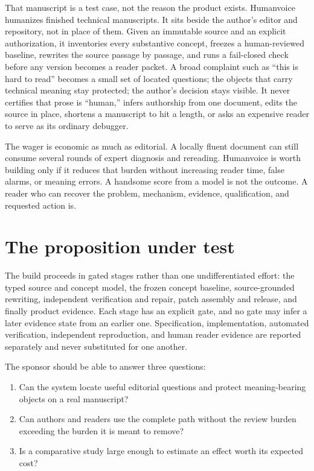 That manuscript is a test case, not the reason the product exists. Humanvoice
humanizes finished technical manuscripts. It sits beside the author's editor and
repository, not in place of them. Given an immutable source and an explicit
authorization, it inventories every substantive concept, freezes a
human-reviewed baseline, rewrites the source passage by passage, and runs a
fail-closed check before any version becomes a reader packet. A broad complaint
such as ``this is hard to read'' becomes a small set of located questions; the
objects that carry technical meaning stay protected; the author's decision stays
visible. It never certifies that prose is ``human,'' infers authorship from one
document, edits the source in place, shortens a manuscript to hit a length, or
asks an expensive reader to serve as its ordinary debugger.

The wager is economic as much as editorial. A locally fluent document can
still consume several rounds of expert diagnosis and rereading. Humanvoice is
worth building only if it reduces that burden without increasing reader time,
false alarms, or meaning errors. A handsome score from a model is not the
outcome. A reader who can recover the problem, mechanism, evidence,
qualification, and requested action is.

\section*{The proposition under test}

The build proceeds in gated stages rather than one undifferentiated effort: the
typed source and concept model, the frozen concept baseline, source-grounded
rewriting, independent verification and repair, patch assembly and release, and
finally product evidence. Each stage has an explicit gate, and no gate may infer
a later evidence state from an earlier one. Specification, implementation,
automated verification, independent reproduction, and human reader evidence are
reported separately and never substituted for one another.

The sponsor should be able to answer three questions:

\begin{enumerate}
\item Can the system locate useful editorial questions and protect
      meaning-bearing objects on a real manuscript?
\item Can authors and readers use the complete path without the review burden
      exceeding the burden it is meant to remove?
\item Is a comparative study large enough to estimate an effect worth its
      expected cost?
\end{enumerate}


